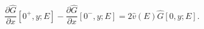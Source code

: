 \begin{equation}
\label{boundary2}
\frac{\partial \hat{G}}{\partial x} [0^+, y; E] - 
\frac{\partial \hat{G}}{\partial x} [0^-, y; E] = 2 \hat{v}(E)
\hat{G}[0, y; E].
\end{equation}

